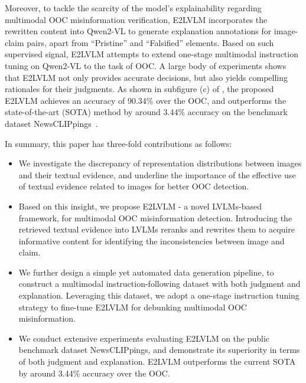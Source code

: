 Moreover, to tackle the scarcity of the model’s explainability regarding multimodal OOC misinformation verification, E2LVLM incorporates the rewritten content into Qwen2-VL to generate explanation annotations for image-claim pairs, apart from ``Pristine'' and ``Falsified'' elements. Based on such supervised signal, E2LVLM attempts to extend one-stage multimodal instruction tuning on Qwen2-VL to the task of OOC. A large body of experiments shows that E2LVLM not only provides accurate decisions, but also yields compelling rationales for their judgments. As shown in subfigure (c) of , the proposed E2LVLM achieves an accuracy of 90.34\% over the OOC, and outperforms the state-of-the-art (SOTA) method by around 3.44\% accuracy on the benchmark dataset NewsCLIPpings~\cite{luo2021newsclippings}.

In summary, this paper has three-fold contributions as follows:
\begin{itemize}
    \item We investigate the discrepancy of representation distributions between images and their textual evidence, and underline the importance of the effective use of textual evidence related to images for better OOC detection.
    \item Based on this insight, we propose E2LVLM - a novel LVLMs-based framework, for multimodal OOC misinformation detection. Introducing the retrieved textual evidence into LVLMs reranks and rewrites them to acquire informative content for identifying the inconsistencies between image and claim.
    \item We further design a simple yet automated data generation pipeline, to construct a multimodal instruction-following dataset with both judgment and explanation.  Leveraging this dataset, we adopt a one-stage instruction tuning strategy to fine-tune E2LVLM for debunking multimodal OOC misinformation.
    \item We conduct extensive experiments evaluating E2LVLM on the public benchmark dataset NewsCLIPpings, and demonstrate its superiority in terms of both judgment and explanation. E2LVLM outperforms the current SOTA by around 3.44\% accuracy over the OOC.
    
\end{itemize}